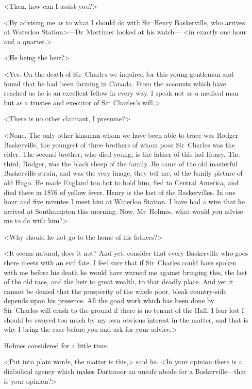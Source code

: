 <Then, how can I assist you?>

<By advising me as to what I should do with Sir~Henry Baskerville, who arrives at Waterloo Station>—Dr~Mortimer looked at his watch— <in exactly one hour and a quarter.>

<He being the heir?>

<Yes. On the death of Sir~Charles we inquired for this young gentleman and found that he had been farming in Canada. From the accounts which have reached us he is an excellent fellow in every way. I speak not as a medical man but as a trustee and executor of Sir~Charles's will.>

<There is no other claimant, I presume?>

<None. The only other kinsman whom we have been able to trace was Rodger Baskerville, the youngest of three brothers of whom poor Sir~Charles was the elder. The second brother, who died young, is the father of this lad Henry. The third, Rodger, was the black sheep of the family. He came of the old masterful Baskerville strain, and was the very image, they tell me, of the family picture of old Hugo. He made England too hot to hold him, fled to Central America, and died there in 1876 of yellow fever. Henry is the last of the Baskervilles. In one hour and five minutes I meet him at Waterloo Station. I have had a wire that he arrived at Southampton this morning. Now, Mr~Holmes, what would you advise me to do with him?>

<Why should he not go to the home of his fathers?>

<It seems natural, does it not? And yet, consider that every Baskerville who goes there meets with an evil fate. I feel sure that if Sir~Charles could have spoken with me before his death he would have warned me against bringing this, the last of the old race, and the heir to great wealth, to that deadly place. And yet it cannot be denied that the prosperity of the whole poor, bleak country-side depends upon his presence. All the good work which has been done by Sir~Charles will crash to the ground if there is no tenant of the Hall. I fear lest I should be swayed too much by my own obvious interest in the matter, and that is why I bring the case before you and ask for your advice.>

Holmes considered for a little time.

<Put into plain words, the matter is this,> said he. <In your opinion there is a diabolical agency which makes Dartmoor an unsafe abode for a Baskerville—that is your opinion?>

